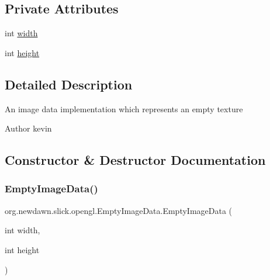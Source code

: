 \subsection*{Private Attributes}
\begin{DoxyCompactItemize}
\item 
int \mbox{\hyperlink{classorg_1_1newdawn_1_1slick_1_1opengl_1_1_empty_image_data_a0db414de2bae9de9483a7f3481c48b5e}{width}}
\item 
int \mbox{\hyperlink{classorg_1_1newdawn_1_1slick_1_1opengl_1_1_empty_image_data_a190ee87309a0084066aad436a0fc267c}{height}}
\end{DoxyCompactItemize}


\subsection{Detailed Description}
An image data implementation which represents an empty texture

\begin{DoxyAuthor}{Author}
kevin 
\end{DoxyAuthor}


\subsection{Constructor \& Destructor Documentation}
\mbox{\label{classorg_1_1newdawn_1_1slick_1_1opengl_1_1_empty_image_data_abbb1aee46053e0d4e4411ec62acc81fa}} 
\subsubsection{\texorpdfstring{Empty\+Image\+Data()}{EmptyImageData()}}
{\footnotesize\ttfamily org.\+newdawn.\+slick.\+opengl.\+Empty\+Image\+Data.\+Empty\+Image\+Data (\begin{DoxyParamCaption}\item[{int}]{width,  }\item[{int}]{height }\end{DoxyParamCaption})\hspace{0.3cm}{\ttfamily [inline]}}

